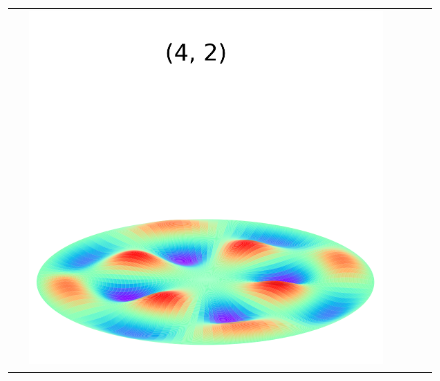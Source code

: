 \documentclass[a4paper]{ctexart}
\begin{document}
\begin{figure}[htbp]
\begin{tabular}{ccccc}
			& \includegraphics[scale=0.4]{4_2.png} \\

\end{tabular}
\end{figure}
\end{document}

